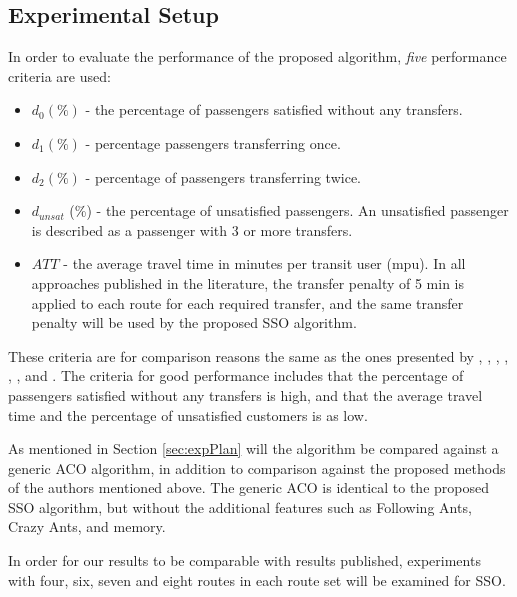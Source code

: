 \subsection{Experimental Setup}
\label{subsec:performanceComparison_setup}
In order to evaluate the performance of the proposed algorithm, \textit{five} performance criteria are used:
\begin{itemize}
\item $d_0 (\%)$ - the percentage of passengers satisfied without any transfers. 
\item $d_1 (\%)$ - percentage passengers transferring once. 
\item $d_2 (\%)$ - percentage of passengers transferring twice. 
\item $d_{unsat}$ (\%) - the percentage of unsatisfied passengers. An unsatisfied passenger is described as a passenger with 3 or more transfers. 
\item $ATT$  - the average travel time in minutes per transit user (mpu). In all approaches published in the literature, the transfer penalty of 5 min is applied to each route for each required transfer, and the same transfer penalty will be used by the proposed SSO algorithm.
\end{itemize}
These criteria are for comparison reasons the same as the ones presented by \citet{mandl79}, \citet{kechagiopoulos14}, \citet{kidwai98}, \citet{fan10}, \citet{chakroborty02}, \citet{zhang10}, and \citet{chew12}. The criteria for good performance includes that the percentage of passengers satisfied without any transfers is high, and that the average travel time and the percentage of unsatisfied customers is as low. 

As mentioned in Section \vref{sec:expPlan} will the algorithm be compared against a generic ACO algorithm, in addition to comparison against the proposed methods of the authors mentioned above. The generic ACO is identical to the proposed SSO algorithm, but without the additional features such as Following Ants, Crazy Ants, and memory. 

In order for our results to be comparable with results published, experiments with four, six, seven and eight routes in each route set will be examined for SSO. 


